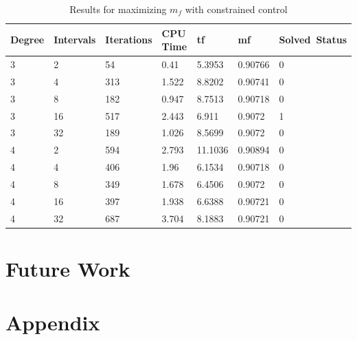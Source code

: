 \documentclass[]{article}
\begin{document}
	\begin{table}
		\begin{tabular}{lllllll}
			Degree & Intervals & Iterations & CPU Time & tf & mf & Solved\ Status \\ 
			\hline 
			3 & 2 & 54 & 0.41 & 5.3953 & 0.90766 & 0 \\ 
			3 & 4 & 313 & 1.522 & 8.8202 & 0.90741 & 0 \\ 
			3 & 8 & 182 & 0.947 & 8.7513 & 0.90718 & 0 \\ 
			3 & 16 & 517 & 2.443 & 6.911 & 0.9072 & 1 \\ 
			3 & 32 & 189 & 1.026 & 8.5699 & 0.9072 & 0 \\ 
			4 & 2 & 594 & 2.793 & 11.1036 & 0.90894 & 0 \\ 
			4 & 4 & 406 & 1.96 & 6.1534 & 0.90718 & 0 \\ 
			4 & 8 & 349 & 1.678 & 6.4506 & 0.9072 & 0 \\ 
			4 & 16 & 397 & 1.938 & 6.6388 & 0.90721 & 0 \\ 
			4 & 32 & 687 & 3.704 & 8.1883 & 0.90721 & 0 \\ 
			\hline 
		\end{tabular}
		\caption{Results for maximizing \(m_f\) with constrained control}
		\label{table:4}
	\end{table}
	\FloatBarrier

	
	\section{Future Work}

	
	\section{Appendix}
	
	
	
	
	
	
    
\end{document}
